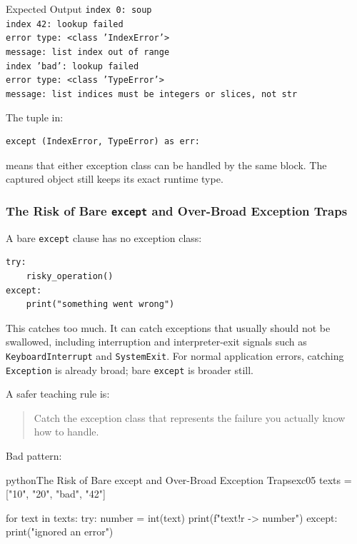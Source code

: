 \documentclass[a4paper,twoside]{report}
\begin{document}
\begin{iobox}{Expected Output}
\texttt{index 0: soup} \\
\texttt{index 42: lookup failed} \\
\texttt{error type: <class 'IndexError'>} \\
\texttt{message: list index out of range} \\
\texttt{index 'bad': lookup failed} \\
\texttt{error type: <class 'TypeError'>} \\
\texttt{message: list indices must be integers or slices, not str} \\
\end{iobox}


The tuple in:

\begin{verbatim}
except (IndexError, TypeError) as err:
\end{verbatim}

means that either exception class can be handled by the same block. The captured object still keeps its exact runtime type.

\subsubsection{The Risk of Bare \texttt{except} and Over-Broad Exception Traps}

A bare \texttt{except} clause has no exception class:

\begin{verbatim}
try:
    risky_operation()
except:
    print("something went wrong")
\end{verbatim}

This catches too much. It can catch exceptions that usually should not be swallowed, including interruption and interpreter-exit signals such as \texttt{KeyboardInterrupt} and \texttt{SystemExit}. For normal application errors, catching \texttt{Exception} is already broad; bare \texttt{except} is broader still.

A safer teaching rule is:

\begin{quote}
Catch the exception class that represents the failure you actually know how to handle.
\end{quote}

Bad pattern:

\begin{codebox}[]{python}{The Risk of Bare except and Over-Broad Exception Traps}{exc05}
texts = ["10", "20", "bad", "42"]

for text in texts:
    try:
        number = int(text)
        print(f"{text!r} -> {number}")
    except:
        print("ignored an error")
\end{codebox}
\end{document}
